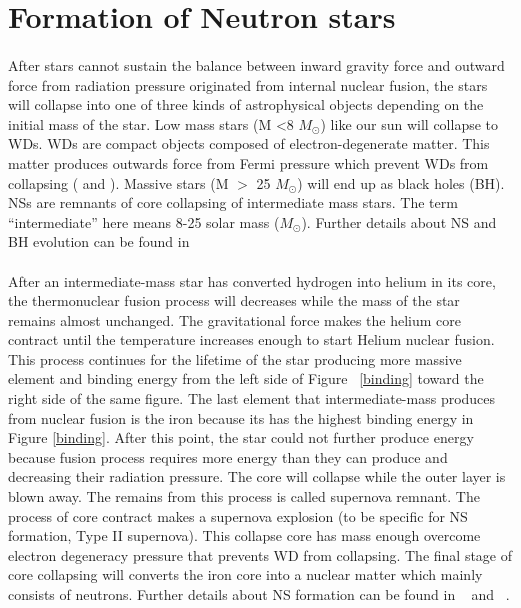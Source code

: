 \documentclass[thesis_msc.tex]{subfiles}
\begin{document}
    \section{Formation of Neutron stars} \label{formation}
    \paragraph{} After stars cannot sustain the balance between inward gravity force and outward force from radiation pressure originated from internal nuclear fusion, the stars will collapse into one of three kinds of astrophysical objects depending on the initial mass of the star. Low mass stars (M \textless 8 $M_\odot$) like our sun will collapse to WDs. WDs are compact objects composed of electron-degenerate matter. This matter produces outwards force from Fermi pressure which prevent WDs from collapsing (\cite{chandrasekhar1931maximum} and \cite{d1997evolution}). Massive stars (M $>$ 25 $M_\odot$) will end up as black holes (BH). NSs are remnants of core collapsing of intermediate mass stars. The term ``intermediate'' here means 8-25 solar mass ($M_\odot$). Further details about NS and BH evolution can be found in \cite{heger2003massive}

    \paragraph{} After an intermediate-mass star has converted hydrogen into helium in its core, the thermonuclear fusion process will decreases while the mass of the star remains almost unchanged. The gravitational force makes the helium core contract until the temperature increases enough to start Helium nuclear fusion. This process continues for the lifetime of the star producing more massive element and binding energy from the left side of Figure ~\ref{binding} toward the right side of the same figure. The last element that intermediate-mass produces from nuclear fusion is the iron because its has the highest binding energy in Figure \ref{binding}. After this point, the star could not further produce energy because fusion process requires more energy than they can produce \citep{burbidge1957synthesis} and decreasing their radiation pressure. The core will collapse while the outer layer is blown away. The remains from this process is called supernova remnant. The process of core contract makes a supernova explosion (to be specific for NS formation, Type II supernova). This collapse core has mass enough overcome electron degeneracy pressure that prevents WD from collapsing. The final stage of core collapsing will converts the iron core into a nuclear matter which mainly consists of neutrons. Further details about NS formation can be found in ~\cite{cameron1969neutron} and ~\cite{portegies1998formation}. 
\end{document}
